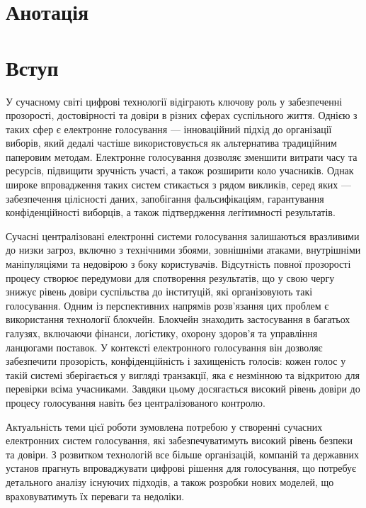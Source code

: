 \documentclass[14pt]{extreport}
\begin{document}
  \chapter*{Анотація}
  
  \tableofcontents
  \newpage
  
  \chapter*{Вступ}
  
  У сучасному світі цифрові технології відіграють ключову роль у забезпеченні прозорості, достовірності та довіри в різних сферах суспільного життя. Однією з таких сфер є електронне голосування — інноваційний підхід до організації виборів, який дедалі частіше використовується як альтернатива традиційним паперовим методам. Електронне голосування дозволяє зменшити витрати часу та ресурсів, підвищити зручність участі, а також розширити коло учасників. Однак широке впровадження таких систем стикається з рядом викликів, серед яких — забезпечення цілісності даних, запобігання фальсифікаціям, гарантування конфіденційності виборців, а також підтвердження легітимності результатів.

  Сучасні централізовані електронні системи голосування залишаються вразливими до низки загроз, включно з технічними збоями, зовнішніми атаками, внутрішніми маніпуляціями та недовірою з боку користувачів. Відсутність повної прозорості процесу створює передумови для спотворення результатів, що у свою чергу знижує рівень довіри суспільства до інституцій, які організовують такі голосування. Одним із перспективних напрямів розв'язання цих проблем є використання технології блокчейн. Блокчейн знаходить застосування в багатьох галузях, включаючи фінанси, логістику, охорону здоров'я та управління ланцюгами поставок. У контексті електронного голосування він дозволяє забезпечити прозорість, конфіденційність і захищеність голосів: кожен голос у такій системі зберігається у вигляді транзакції, яка є незмінною та відкритою для перевірки всіма учасниками. Завдяки цьому досягається високий рівень довіри до процесу голосування навіть без централізованого контролю.

  Актуальність теми цієї роботи зумовлена потребою у створенні сучасних електронних систем голосування, які забезпечуватимуть високий рівень безпеки та довіри. З розвитком технологій все більше організацій, компаній та державних установ прагнуть впроваджувати цифрові рішення для голосування, що потребує детального аналізу існуючих підходів, а також розробки нових моделей, що враховуватимуть їх переваги та недоліки.
\end{document}
